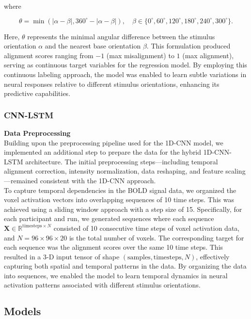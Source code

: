 \documentclass[a4paper]{article}
\begin{document}
\noindent where

\[
\theta = \min\left( |\alpha - \beta|, 360^\circ - |\alpha - \beta| \right), \quad \beta \in \{0^\circ, 60^\circ, 120^\circ, 180^\circ, 240^\circ, 300^\circ\}.
\]

\noindent Here, \(\theta\) represents the minimal angular difference between the stimulus orientation \(\alpha\) and the nearest base orientation \(\beta\). This formulation produced alignment scores ranging from \(-1\) (max misalignment) to \(1\) (max alignment), serving as continuous target variables for the regression model. By employing this continuous labeling approach, the model was enabled to learn subtle variations in neural responses relative to different stimulus orientations, enhancing its predictive capabilities.\\

\subsubsection{\textbf{CNN-LSTM}}
\textbf{Data Preprocessing}\\
Building upon the preprocessing pipeline used for the 1D-CNN model, we implemented an additional step to prepare the data for the hybrid 1D-CNN-LSTM architecture. The initial preprocessing steps—including temporal alignment correction, intensity normalization, data reshaping, and feature scaling—remained consistent with the 1D-CNN approach.\\

\noindent To capture temporal dependencies in the BOLD signal data, we organized the voxel activation vectors into overlapping sequences of 10 time steps. This was achieved using a sliding window approach with a step size of 15. Specifically, for each participant and run, we generated sequences where each sequence \( \mathbf{X} \in \mathbb{R}^{\text{timesteps} \times N} \) consisted of 10 consecutive time steps of voxel activation data, and \( N = 96 \times 96 \times 20 \) is the total number of voxels. The corresponding target for each sequence was the alignment scores over the same 10 time steps. This resulted in a 3-D input tensor of shape \( (\text{samples}, \text{timesteps}, N) \), effectively capturing both spatial and temporal patterns in the data. By organizing the data into sequences, we enabled the model to learn temporal dynamics in neural activation patterns associated with different stimulus orientations.\\


\subsection{Models}
\end{document}
